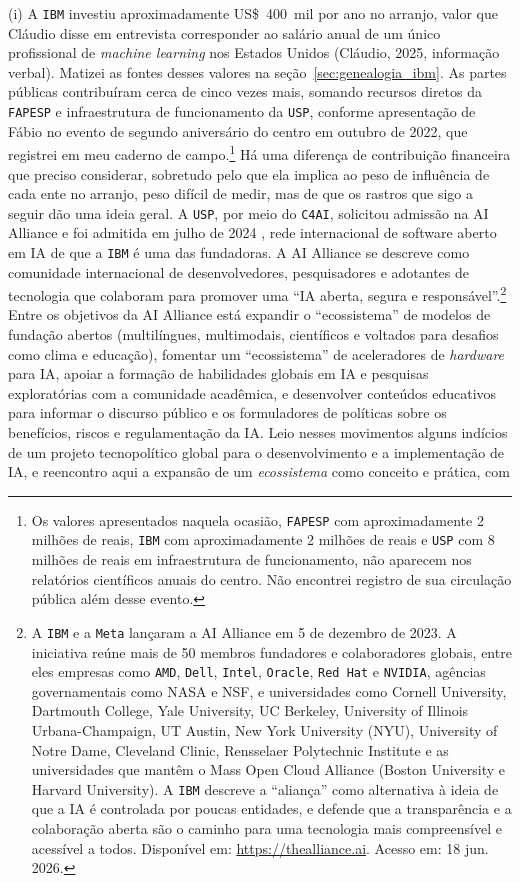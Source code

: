 (i) A \texttt{IBM} investiu aproximadamente US\$~400~mil por ano no arranjo, valor que Cláudio disse em entrevista corresponder ao salário anual de um único profissional de \textit{machine learning} nos Estados Unidos (Cláudio, 2025, informação verbal). Matizei as fontes desses valores na seção~\ref{sec:genealogia_ibm}. As partes públicas contribuíram cerca de cinco vezes mais, somando recursos diretos da \texttt{FAPESP} e infraestrutura de funcionamento da \texttt{USP}, conforme apresentação de Fábio no evento de segundo aniversário do centro em outubro de 2022, que registrei em meu caderno de campo.\footnote{Os valores apresentados naquela ocasião, \texttt{FAPESP} com aproximadamente 2 milhões de reais, \texttt{IBM} com aproximadamente 2 milhões de reais e \texttt{USP} com 8 milhões de reais em infraestrutura de funcionamento, não aparecem nos relatórios científicos anuais do centro. Não encontrei registro de sua circulação pública além desse evento.} Há uma diferença de contribuição financeira que preciso considerar, sobretudo pelo que ela implica ao peso de influência de cada ente no arranjo, peso difícil de medir, mas de que os rastros que sigo a seguir dão uma ideia geral. A \texttt{USP}, por meio do \texttt{C4AI}, solicitou admissão na AI Alliance e foi admitida em julho de 2024 \parencite{C4AI2024}, rede internacional de software aberto em IA de que a \texttt{IBM} é uma das fundadoras. A AI Alliance se descreve como comunidade internacional de desenvolvedores, pesquisadores e adotantes de tecnologia que colaboram para promover uma \enquote{IA aberta, segura e responsável}.\footnote{A \texttt{IBM} e a \texttt{Meta} lançaram a AI Alliance em 5 de dezembro de 2023. A iniciativa reúne mais de 50 membros fundadores e colaboradores globais, entre eles empresas como \texttt{AMD}, \texttt{Dell}, \texttt{Intel}, \texttt{Oracle}, \texttt{Red Hat} e \texttt{NVIDIA}, agências governamentais como NASA e NSF, e universidades como Cornell University, Dartmouth College, Yale University, UC Berkeley, University of Illinois Urbana-Champaign, UT Austin, New York University (NYU), University of Notre Dame, Cleveland Clinic, Rensselaer Polytechnic Institute e as universidades que mantêm o Mass Open Cloud Alliance (Boston University e Harvard University). A \texttt{IBM} descreve a \enquote{aliança} como alternativa à ideia de que a IA é controlada por poucas entidades, e defende que a transparência e a colaboração aberta são o caminho para uma tecnologia mais compreensível e acessível a todos. Disponível em: \url{https://thealliance.ai}. Acesso em: 18 jun. 2026.} Entre os objetivos da AI Alliance está expandir o \enquote{ecossistema} de modelos de fundação abertos (multilíngues, multimodais, científicos e voltados para desafios como clima e educação), fomentar um \enquote{ecossistema} de aceleradores de \emph{hardware} para IA, apoiar a formação de habilidades globais em IA e pesquisas exploratórias com a comunidade acadêmica, e desenvolver conteúdos educativos para informar o discurso público e os formuladores de políticas sobre os benefícios, riscos e regulamentação da IA. Leio nesses movimentos alguns indícios de um projeto tecnopolítico global para o desenvolvimento e a implementação de IA, e reencontro aqui a expansão de um \textit{ecossistema} como conceito e prática, com 